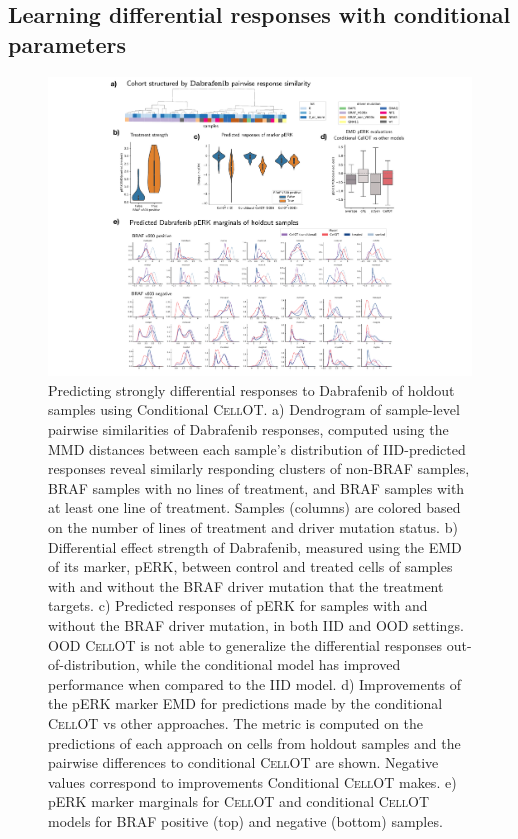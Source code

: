 \subsection{Learning differential responses with conditional parameters}

\begin{figure}[htp!]
  \begin{center}
    \includegraphics[width=\textwidth]{figures/cellot-cohort/condot.pdf}
  \end{center}
  \caption{
    Predicting strongly differential responses to Dabrafenib of holdout samples using Conditional \textsc{CellOT}.
    a) Dendrogram of sample-level pairwise similarities of Dabrafenib responses, computed using the MMD distances between each sample's distribution of IID-predicted responses reveal similarly responding clusters of non-BRAF samples, BRAF samples with no lines of treatment, and BRAF samples with at least one line of treatment.
    Samples (columns) are colored based on the number of lines of treatment and driver mutation status.
    b) Differential effect strength of Dabrafenib, measured using the EMD of its marker, pERK, between control and treated cells of samples with and without the BRAF driver mutation that the treatment targets.
    c) Predicted responses of pERK for samples with and without the BRAF driver mutation, in both IID and OOD settings.
    OOD \textsc{CellOT} is not able to generalize the differential responses out-of-distribution, while the conditional model has improved performance when compared to the IID model.
    d) Improvements of the pERK marker EMD for predictions made by the conditional \textsc{CellOT} vs other approaches. The metric is computed on the predictions of each approach on cells from holdout samples and the pairwise differences to conditional \textsc{CellOT} are shown. Negative values correspond to improvements Conditional \textsc{CellOT} makes. 
    e) pERK marker marginals for \textsc{CellOT} and conditional \textsc{CellOT} models for BRAF positive (top) and negative (bottom) samples.
  }\label{fig:conditional-ot}
\end{figure}

